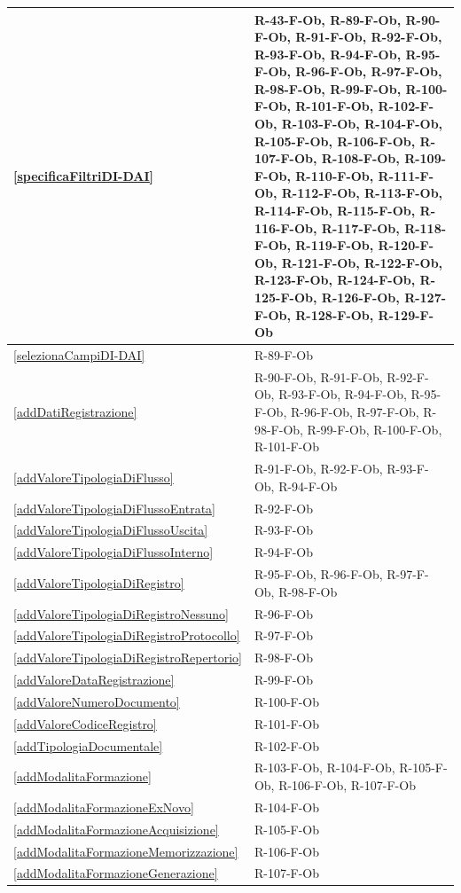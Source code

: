 \begin{longtable}{|p{4cm}|p{10cm}|}
\hline
\ref{specificaFiltriDI-DAI} & R-43-F-Ob, R-89-F-Ob, R-90-F-Ob, R-91-F-Ob, R-92-F-Ob, R-93-F-Ob, R-94-F-Ob, R-95-F-Ob, R-96-F-Ob, R-97-F-Ob, R-98-F-Ob, R-99-F-Ob, R-100-F-Ob, R-101-F-Ob, R-102-F-Ob, R-103-F-Ob, R-104-F-Ob, R-105-F-Ob, R-106-F-Ob, R-107-F-Ob, R-108-F-Ob, R-109-F-Ob, R-110-F-Ob, R-111-F-Ob, R-112-F-Ob, R-113-F-Ob, R-114-F-Ob, R-115-F-Ob, R-116-F-Ob, R-117-F-Ob, R-118-F-Ob, R-119-F-Ob, R-120-F-Ob, R-121-F-Ob, R-122-F-Ob, R-123-F-Ob, R-124-F-Ob, R-125-F-Ob, R-126-F-Ob, R-127-F-Ob, R-128-F-Ob, R-129-F-Ob \\
\hline
\ref{selezionaCampiDI-DAI} & R-89-F-Ob \\
\hline
\ref{addDatiRegistrazione} & R-90-F-Ob, R-91-F-Ob, R-92-F-Ob, R-93-F-Ob, R-94-F-Ob, R-95-F-Ob, R-96-F-Ob, R-97-F-Ob, R-98-F-Ob, R-99-F-Ob, R-100-F-Ob, R-101-F-Ob \\
\hline
\ref{addValoreTipologiaDiFlusso} & R-91-F-Ob, R-92-F-Ob, R-93-F-Ob, R-94-F-Ob \\
\hline
\ref{addValoreTipologiaDiFlussoEntrata} & R-92-F-Ob \\
\hline
\ref{addValoreTipologiaDiFlussoUscita} & R-93-F-Ob \\
\hline
\ref{addValoreTipologiaDiFlussoInterno} & R-94-F-Ob \\
\hline
\ref{addValoreTipologiaDiRegistro} & R-95-F-Ob, R-96-F-Ob, R-97-F-Ob, R-98-F-Ob \\
\hline
\ref{addValoreTipologiaDiRegistroNessuno} & R-96-F-Ob \\
\hline
\ref{addValoreTipologiaDiRegistroProtocollo} & R-97-F-Ob \\
\hline
\ref{addValoreTipologiaDiRegistroRepertorio} & R-98-F-Ob \\
\hline
\ref{addValoreDataRegistrazione} & R-99-F-Ob \\
\hline
\ref{addValoreNumeroDocumento} & R-100-F-Ob \\
\hline
\ref{addValoreCodiceRegistro} & R-101-F-Ob \\
\hline
\ref{addTipologiaDocumentale} & R-102-F-Ob \\
\hline
\ref{addModalitaFormazione} & R-103-F-Ob, R-104-F-Ob, R-105-F-Ob, R-106-F-Ob, R-107-F-Ob \\
\hline
\ref{addModalitaFormazioneExNovo} & R-104-F-Ob \\
\hline
\ref{addModalitaFormazioneAcquisizione} & R-105-F-Ob \\
\hline
\ref{addModalitaFormazioneMemorizzazione} & R-106-F-Ob \\
\hline
\ref{addModalitaFormazioneGenerazione} & R-107-F-Ob \\

\end{longtable}
